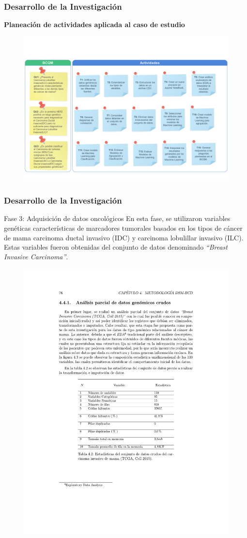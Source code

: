 \documentclass[xcolor=dvipsnames,xcolor=table,10pt]{beamer} %
\begin{document}
\begin{frame}
	\frametitle{Desarrollo de la Investigación}{\textbf{Planeación de actividades aplicada al caso de estudio}}
	\begin{figure}[h!]
		\centering
		\includegraphics[width=0.87\linewidth]{IMAGENES/Planning_TCGA}
	\end{figure}
\end{frame}	

\begin{frame}
	\frametitle{Desarrollo de la Investigación}
	\begin{block}{Fase 3: Adquisición de datos oncológicos}\justifying
	En esta fase, se utilizaron variables genéticas características de marcadores tumorales basados en los tipos de cáncer de mama carcinoma ductal invasivo (IDC) y carcinoma lobulillar invasivo (ILC). Estas variables fueron obtenidas del conjunto de datos denominado \textit{“Breast Invasive Carcinoma”}.
	\end{block}
	
	\begin{figure}[h!]
		\centering
		\includegraphics[width=0.55\linewidth]{IMAGENES/Adquisicion_datos}
	\end{figure}
\end{frame}
\end{document}
